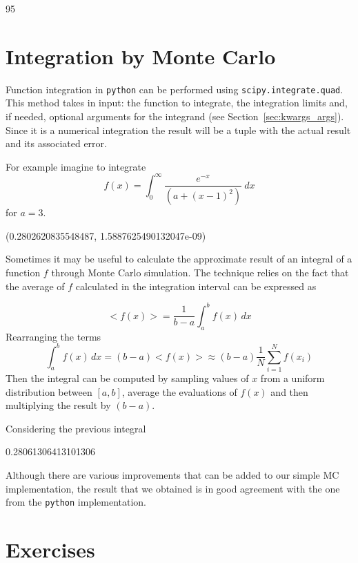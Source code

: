 \begin{ioutput}
95%
\end{ioutput}

\section{Integration by Monte Carlo}
\label{sec:integration}

\begin{finmarkets}
Function integration in \texttt{python} can be performed using \texttt{scipy.integrate.quad}. This method takes in input: the function to integrate, the integration limits and, if needed, optional arguments for the integrand (see Section~\ref{sec:kwargs_args}). Since it is a numerical integration the result will be a tuple with the actual result and its associated error.

For example imagine to integrate
\begin{equation*}
f(x) = \int_{0}^{\infty}\frac{e^{-x}}{\left(a + (x-1)^2\right)}~dx
\end{equation*}
for $a=3$.

\begin{ioutput}
(0.2802620835548487, 1.5887625490132047e-09)
\end{ioutput}
\end{finmarkets}

Sometimes it may be useful to calculate the approximate result of an integral of a function $f$ through Monte Carlo simulation. The technique relies on the fact that the average of $f$ calculated in the integration interval can be expressed as

\begin{equation}
<f(x)> = \frac{1}{b-a} \int_{a}^{b} f(x) \,dx
\end{equation}
Rearranging the terms
\begin{equation}
\int_{a}^{b} f(x) \,dx = 
(b-a) <f(x)> \approx (b-a) \frac{1}{N} \sum_{i=1}^{N} f(x_i)
\end{equation}
Then the integral can be computed by sampling values of $x$ from a uniform distribution between $[a,b]$, average the evaluations of $f(x)$ and then multiplying the result by $(b-a)$.

Considering the previous integral

\begin{ioutput}
0.28061306413101306
\end{ioutput} 
 
Although there are various improvements that can be added to our simple MC implementation, the result that we obtained is in good agreement with the one from the \texttt{python} implementation.  
 
\section*{Exercises}










